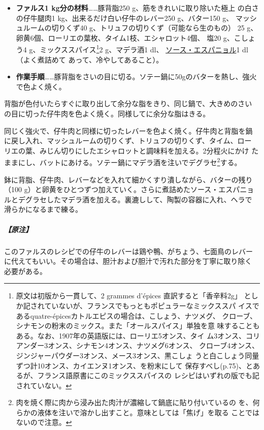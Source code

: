 \begin{recette}
\begin{itemize}
\item
  \textbf{ファルス1 kg分の材料}\ldots{}\ldots{}豚背脂250
  g、筋をきれいに取り除いた極上 の白さの仔牛腿肉1
  kg、出来るだけ白い仔牛のレバー250 g、バター150 g、
  マッシュルームの切りくず40 g、トリュフの切りくず（可能なら生のもの）
  25 g、卵黄6個、ローリエの葉\undemi{}枚、タイム1枝、エシャロット4個、
  塩20 g、こしょう4 g、ミックススパイス\footnote{原文は初版から一貫して、2
    grammes d'épices 直訳すると「香辛料2g」
    としか記されていないが、フランスでもっともポピュラーなミックススパ
    イスであるquatre-épicesカトルエピスの場合は、こしょう、ナツメグ、
    クローブ、シナモンの粉末のミックス。また「オールスパイス」単独を意
    味することもある。なお、1907年の英語版には、ローリエ5オンス、タイ
    ム3オンス、コリアンダー3オンス、シナモン4オンス、ナツメグ6オンス、
    クローブ4オンス、ジンジャーパウダー3オンス、メース3オンス、黒こしょ
    うと白こしょう同量ずつ計10オンス、カイエンヌ1オンス、を粉末にして
    保存すべし(p.75)、とあるが、フランス語原書にこのミックススパイスの
    レシピはいずれの版でも記されていない。}2 g、マデラ酒1\undemi{} dl、
  \protect\hyperlink{sauce-espagnole}{ソース・エスパニョル}1\undemi{}
  dl（よく煮詰めて あって、冷やしてあること）。
\item
  \textbf{作業手順}\ldots{}\ldots{}豚背脂をさいの目に切る。ソテー鍋に50gのバターを熱し、強火で色よく焼く。
\end{itemize}

背脂が色付いたらすぐに取り出して余分な脂をきり、同じ鍋で、大きめのさい
の目に切った仔牛肉を色よく焼く。同様してに余分な脂はきる。

同じく強火で、仔牛肉と同様に切ったレバーを色よく焼く。仔牛肉と背脂を鍋
に戻し入れ、マッシュルームの切りくず、トリュフの切りくず、タイム、ロー
リエの葉、みじん切りにしたエシャロットと調味料を加える。2分程火にかけ
たままにし、バットにあける。ソテー鍋にマデラ酒を注いでデグラセ\footnote{肉を焼く際に肉から浸み出た肉汁が濃縮して鍋底に貼り付いているの
  を、何らかの液体を注いで溶かし出すこと。意味としては「焦げ」を取る
  ことではないので注意。}する。

鉢に背脂、仔牛肉、レバーなどを入れて細かくすり潰しながら、バターの残り
（100 g）と卵黄をひとつずつ加えていく。さらに煮詰めたソース・エスパニョ
ルとデグラセしたマデラ酒を加える。裏漉しして、陶製の容器に入れ、ヘラで
滑らかになるまで練る。

\hypertarget{nota-farce-gratin-a}{%
\subparagraph{【原注】}\label{nota-farce-gratin-a}}

このファルスのレシピでの仔牛のレバーは鶏や鴨、がちょう、七面鳥のレバー
に代えてもいい。その場合は、胆汁および胆汁で汚れた部分を丁寧に取り除く
必要がある。


\end{recette}
